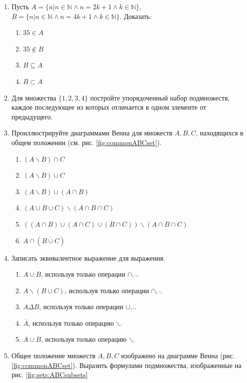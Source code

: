 \begin{enumerate}
    \item Пусть $A=\{n|n\in \mathbb{N} \land n=2k+1 \land k\in \mathbb{N}\}$,$B=\{n|n\in \mathbb{N} \land n=4k+1 \land k\in \mathbb{N}\}$. Доказать: 
    \begin{enumerate}
        \item $35\in A$
        \item $35\not\in B$
        \item $B\subseteq A$
        \item $B\subset A$
    \end{enumerate}
    
    \item Для множества $\{1,2,3,4\}$ постройте упорядоченный набор подмножеств, каждое последующее из которых отличается в одном элементе от предыдущего.
    
    \item Проиллюстрируйте диаграммами Венна для множеств $A,B,C$, находящихся в общем положении (см. рис. \ref{fig:commonABCset}).
    \begin{enumerate}
        \item $(A\backslash B)\cap C$
        \item $(A\backslash B)\cup C$
        \item $(A\backslash B)\cup (A\cap B)$
        \item $(A\cup B \cup C)\backslash(A\cap B\cap C)$
        \item $((A\cap B)\cup(A\cap C)\cup(B\cap C))\backslash(A\cap B\cap C)$
        \item $A\cap(\overline{B\cup C})$
    \end{enumerate}
    
    \item Записать эквивалентное выражение для выражения.
    \begin{enumerate}
        \item $A\cup B$, используя только операции $\cap,\bar{~}$.
        \item $A\backslash(B\cup C)$, используя только операции $\cap,\bar{~}$.
        \item $A\Delta B$, используя только операции $\cup,\bar{~}$.
        \item $\overline{A}$, используя только операцию $\backslash$.
        \item $A\cup B$, используя только операцию $\backslash$.
    \end{enumerate}
    
    \item Общее положение множеств $A,B,C$ изображено на диаграмме Венна (рис. \ref{fig:commonABCset}). Выразить формулами подмножества, изображенные на рис. \ref{fig:sets:ABCsubsets}
    

\end{enumerate}
